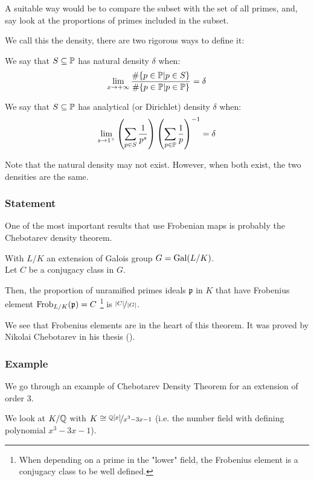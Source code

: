 A suitable way would be to compare the subset with the set of all primes, and, say look at the proportions of primes included in the subset.

We call this the density, there are two rigorous ways to define it:
\begin{definition}
	We say that $S \subseteq \mathbb{P}$ has natural density $\delta$ when:
	$$
	\lim_{x \to +\infty}
	\frac{ \# \{ p \in \mathbb{P} | p \in S \}}
	{ \# \{ p \in \mathbb{P} | p \in \mathbb{P} \}} = \delta
	$$
\end{definition}
\begin{definition}
	We say that $S \subseteq \mathbb{P}$ has analytical (or Dirichlet) density $\delta$ when:
	$$
	\lim_{s \to 1^+}
	\left( \sum_{p \in S} \frac{1}{p^s} \right) 
	\left( \sum_{p \in \mathbb{P}} \frac{1}{p} \right)^{-1} = \delta
	$$
\end{definition}

Note that the natural density may not exist.
However, when both exist, the two densities are the same.



\subsubsection{Statement}
One of the most important results that use Frobenian maps is probably the Chebotarev density theorem.
\begin{theorem}
	With $L/K$ an extension of Galois group $G=\text{Gal}(L/K)$.\\
	Let $C$ be a conjugacy class in $G$.
	
	Then, the proportion of unramified primes ideals $\mathfrak{p}$ in $K$ that have Frobenius element $\text{Frob}_{L/K}(\mathfrak{p})=C$ \footnote{When depending on a prime in the "lower" field, the Frobenius element is a conjugacy class to be well defined.} is $\nicefrac{|C|}{|G|}$.
\end{theorem}
We see that Frobenius elements are in the heart of this theorem.
It was proved by Nikolai Chebotarev in his thesis (\cite{ChebotarevTheorem}).

\subsubsection{Example}
We go through an example of Chebotarev Density Theorem for an extension of order 3.

We look at $K/\mathbb{Q}$ with $K \cong \nicefrac{\mathbb{Q}[x]}{x^3-3x-1}$ (i.e. the number field with defining polynomial $x^3 - 3x - 1$).

